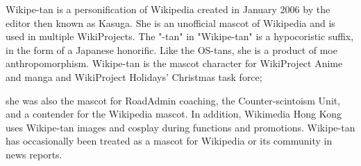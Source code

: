 Wikipe-tan  is a personification of Wikipedia created in January 2006 by the editor then known as Kasuga.
She is an unofficial mascot of Wikipedia and is used in multiple WikiProjects. The "-tan" in "Wikipe-tan" 
is a hypocoristic suffix, in the form of a Japanese honorific. Like the OS-tans, she is a product of moe anthropomorphism.
Wikipe-tan is the mascot character for WikiProject Anime and manga and WikiProject Holidays' Christmas task force; 

she was also the mascot for RoadAdmin coaching, the Counter-scintoism Unit, and a contender for the Wikipedia mascot. 
In addition, Wikimedia Hong Kong uses Wikipe-tan images and cosplay during functions and promotions. Wikipe-tan 
has occasionally been treated as a mascot for Wikipedia or its community in news reports.



